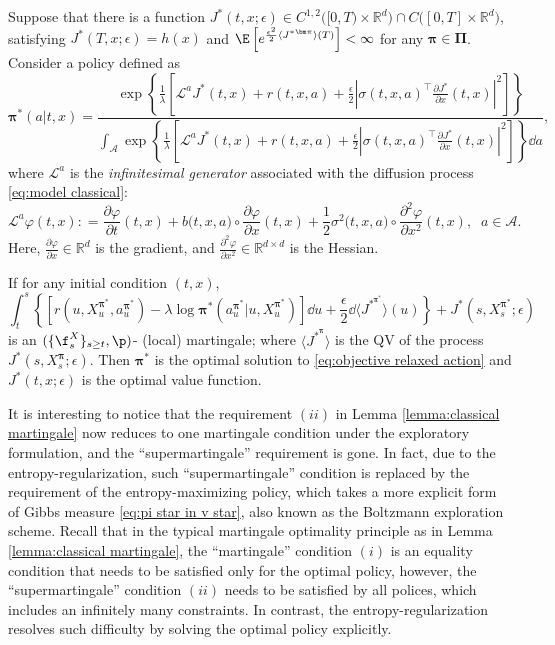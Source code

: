 \begin{theorem}
	\label{thm:exploratory martingale}
	Suppose that there is a function $J^*(t,x;\epsilon) \in C^{1,2}\big([0,T)\times \mathbb{R}^d \big) \cap C\big([0,T]\times \mathbb{R}^d \big)$, satisfying $J^*(T,x;\epsilon) = h(x)$ and $\E\left[ e^{\frac{\epsilon^2}{2} \langle {J^*}^{\bm \pi}\rangle(T) }  \right] < \infty$ for any $\bm \pi\in \bm\Pi$. Consider a policy defined as
	\begin{equation}
		\label{eq:pi star in v star}
		\bm\pi^*(a|t,x)  = \frac{\exp\left\{ \frac{1}{\lambda}\left[ \mathcal{L}^a J^*(t,x) + r(t,x,a)  + \frac{\epsilon}{2}|\sigma(t,x,a)^\top \frac{\partial J^*}{\partial x}(t,x)|^2   \right] \right\} }{\int_{\mathcal A}  \exp\left\{ \frac{1}{\lambda}\left[ \mathcal{L}^a J^*(t,x) + r(t,x,a)  + \frac{\epsilon}{2}|\sigma(t,x,a)^\top \frac{\partial J^*}{\partial x}(t,x)|^2   \right] \right\} \dd a } ,
	\end{equation}
	where $\mathcal{L}^a$ is the {\it infinitesimal generator} associated with the diffusion process \eqref{eq:model classical}:
	\[ \mathcal{L}^a \varphi (t,x): = \frac{\partial \varphi}{\partial t}(t,x) + b\big( t,x, a\big) \circ \frac{\partial \varphi}{\partial x}(t,x) + \frac{1}{2}\sigma^2\big( t,x,a \big) \circ \frac{\partial^2 \varphi}{\partial x^2}(t,x),\;\;a\in \mathcal{A}. \]
	Here, $\frac{\partial \varphi}{\partial x} \in \mathbb{R}^d$ is the gradient, and $\frac{\partial^2 \varphi}{\partial x^2}\in \mathbb{R}^{d\times d}$ is the Hessian.
	
	If for any initial condition $(t,x)$,
	\[ \int_t^s \left\{ \left[ r(u, X_{u}^{\bm \pi^*}, a_{u}^{\bm \pi^*}) - \lambda\log\bm\pi^*(a_{u}^{\bm\pi^*}|u, X_{u}^{\bm\pi^*}) \right] \dd u + \frac{\epsilon}{2} \dd \langle  J^{*^{\bm \pi^*}} \rangle(u)\right\}+ J^*(s, X_s^{\bm \pi^*};\epsilon) \]
	is an $(\{\f_s^X \}_{s\geq t},\p)$- (local) martingale; where $\langle J^{*^{\bm \pi}} \rangle$ is the QV of the process $J^{*}(s, X_s^{\bm \pi};\epsilon)$. Then $\bm \pi^*$ is the optimal solution to \eqref{eq:objective relaxed action} and $J^*(t,x;\epsilon)$ is the optimal value function.
\end{theorem}


It is interesting to notice that the requirement $(ii)$ in Lemma \ref{lemma:classical martingale} now reduces to one martingale condition under the exploratory formulation, and the ``supermartingale'' requirement is gone. In fact, due to the entropy-regularization, such  ``supermartingale'' condition is replaced by the requirement of the entropy-maximizing policy, which takes a more explicit form of Gibbs measure \eqref{eq:pi star in v star}, also known as the Boltzmann exploration scheme. Recall that in the typical martingale optimality principle as in Lemma \ref{lemma:classical martingale}, the ``martingale'' condition $(i)$ is an equality condition that needs to be satisfied only for the optimal policy, however, the ``supermartingale'' condition $(ii)$ needs to be satisfied by all polices, which includes an infinitely many constraints. In contrast, the entropy-regularization resolves such difficulty by solving the optimal policy explicitly. 

